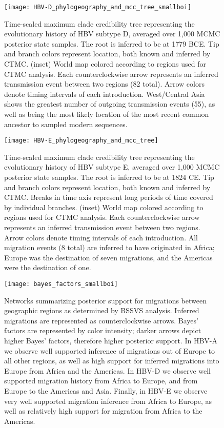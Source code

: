 \begin{figure}[ht]
  \centering
  \medskip
  \texttt{[image: HBV-D\_phylogeography\_and\_mcc\_tree\_smallboi]}
  \caption[HBV-D Phylogeography]{Time-scaled maximum clade credibility tree representing the evolutionary history of HBV subtype D, averaged over 1,000 MCMC posterior state samples. The root is inferred to be at 1779 BCE. Tip and branch colors represent location, both known and inferred by CTMC. (inset) World map colored according to regions used for CTMC analysis. Each counterclockwise arrow represents an inferred transmission event between two regions (82 total). Arrow colors denote timing intervals of each introduction. West/Central Asia shows the greatest number of outgoing transmission events (55), as well as being the most likely location of the most recent common ancestor to sampled modern sequences.}
  \label{fig:HBV-D_phylogeo}
\end{figure}

\begin{figure}[ht]
  \centering
  \medskip
  \texttt{[image: HBV-E\_phylogeography\_and\_mcc\_tree]}
  \caption[HBV-E Phylogeography]{Time-scaled maximum clade credibility tree representing the evolutionary history of HBV subtype E, averaged over 1,000 MCMC posterior state samples. The root is inferred to be at 1824 CE. Tip and branch colors represent location, both known and inferred by CTMC. Breaks in time axis represent long periods of time covered by individual branches. (inset) World map colored according to regions used for CTMC analysis. Each counterclockwise arrow represents an inferred transmission event between two regions. Arrow colors denote timing intervals of each introduction. All migration events (8 total) are inferred to have originated in Africa; Europe was the destination of seven migrations, and the Americas were the destination of one.}
  \label{fig:HBV-E_phylogeo}
\end{figure}

\begin{figure}[ht]
  \centering
  \medskip
  \texttt{[image: bayes\_factors\_smallboi]}
  \caption[Bayes' factors of HBV geographic transitions]{Networks summarizing posterior support for migrations between geographic regions as determined by BSSVS analysis. Inferred migrations are represented as counterclockwise arrows. Bayes' factors are represented by color intensity; darker arrows depict higher Bayes' factors, therefore higher posterior support. In HBV-A we observe well supported inference of migrations out of Europe to all other regions, as well as high support for inferred migrations into Europe from Africa and the Americas. In HBV-D we observe well supported migration history from Africa to Europe, and from Europe to the Americas and Asia. Finally, in HBV-E we observe very well supported migration inference from Africa to Europe, as well as relatively high support for migration from Africa to the Americas.}
  \label{fig:bayes_factors}
\end{figure}

